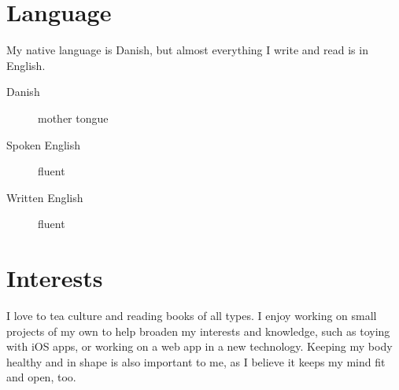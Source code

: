 \documentclass[margin,line]{resume}
\begin{document}
\begin{resume}
\section{\mysidestyle{} Language}
My native language is Danish, but almost everything I write and read is in English.

\begin{description}
  \item[Danish] mother tongue
  \item[Spoken English] fluent
  \item[Written English] fluent 
\end{description}

\section{\mysidestyle{} Interests}
I love to tea culture and reading books of all types. I enjoy working on small projects of my own to help broaden my interests and knowledge, such as toying with iOS apps, or working on a web app in a new technology. Keeping my body healthy and in shape is also important to me, as I believe it keeps my mind fit and open, too.

\end{resume}
\end{document}
